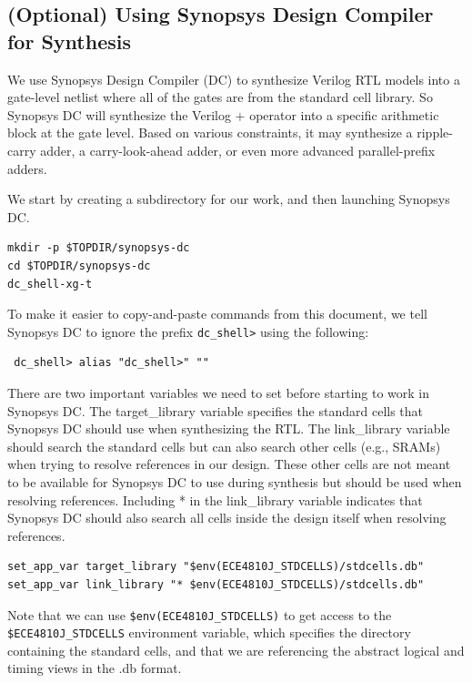 \documentclass[a4paper,12pt,twoside]{article}
\begin{document}
\subsection{(Optional) Using Synopsys Design Compiler for Synthesis}
We use Synopsys Design Compiler (DC) to synthesize Verilog RTL models into a gate-level netlist where all of the gates are from the standard cell library. So Synopsys DC will synthesize the Verilog + operator into a specific arithmetic block at the gate level. Based on various constraints, it may synthesize a ripple-carry adder, a carry-look-ahead adder, or even more advanced parallel-prefix adders.

We start by creating a subdirectory for our work, and then launching Synopsys DC.
\begin{verbatim}
mkdir -p $TOPDIR/synopsys-dc
cd $TOPDIR/synopsys-dc
dc_shell-xg-t
\end{verbatim}
To make it easier to copy-and-paste commands from this document, we tell Synopsys DC to ignore the prefix \verb|dc_shell>| using the following:
\begin{verbatim}
 dc_shell> alias "dc_shell>" ""
\end{verbatim}
There are two important variables we need to set before starting to work in Synopsys DC. The target\_library variable specifies the standard cells that Synopsys DC should use when synthesizing the RTL. The link\_library variable should search the standard cells but can also search other cells (e.g., SRAMs) when trying to resolve references in our design. These other cells are not meant to be available for Synopsys DC to use during synthesis but should be used when resolving references. Including * in the link\_library variable indicates that Synopsys DC should also search all cells inside the design itself when resolving references.
\begin{verbatim}
set_app_var target_library "$env(ECE4810J_STDCELLS)/stdcells.db"
set_app_var link_library "* $env(ECE4810J_STDCELLS)/stdcells.db"
\end{verbatim}
Note that we can use \texttt{\$env(ECE4810J\_STDCELLS)} to get access to the \texttt{\$ECE4810J\_STDCELLS} environment variable, which specifies the directory containing the standard cells, and that we are referencing the abstract logical and timing views in the .db format.
\end{document}
